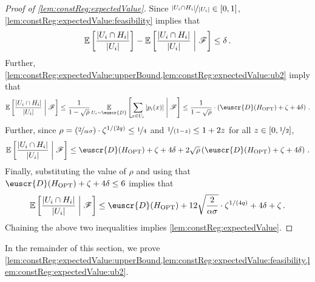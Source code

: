 \documentclass[11pt]{article}
\theoremstyle{plain}
\theoremstyle{definition}
\theoremstyle{remark}
\def\abs#1{\left| #1 \right|}
\newcommand{\given}{\;\middle|\;}
\newcommand{\inparen}[1]{\left(#1\right)}
\newcommand{\insquare}[1]{\left[#1\right]}
\newcommand{\evF}{\ensuremath{\mathscr{F}}}
\newcommand{\E}{\operatornamewithlimits{\mathbb{E}}}
\newcommand{\Ex}{\E}
\newcommand{\nfrac}[2]{\nicefrac{#1}{#2}}
\newcommand{\opt}{\ensuremath{\mathrm{OPT}}}
\newcommand{\customcal}[1]{\euscr{#1}}
\newcommand{\cD}{\customcal{D}}
\newcommand{\cDgiven}{\cD}
\begin{document}
        \begin{proof}[Proof of \cref{lem:constReg:expectedValue}]
            Since $\nfrac{\abs{U_i\cap H_i}}{\abs{U_i}}\in [0,1]$, \cref{lem:constReg:expectedValue:feasibility} implies that 
            \[
                \Ex\insquare{
                    \frac{\abs{U_i\cap H_i}}{\abs{U_i}}
                }
                - \Ex\insquare{
                    \frac{\abs{U_i\cap H_i}}{\abs{U_i}}\given \evF
                }
                \leq \delta\,.
            \]
            Further, \cref{lem:constReg:expectedValue:upperBound,lem:constReg:expectedValue:ub2} imply that 
            \[
                \Ex\insquare{
                    \frac{\abs{U_i\cap H_i}}{\abs{U_i}}\given \evF
                }\leq \frac{1}{1-\sqrt{\rho}}\Ex_{U_i\sim \cDgiven}\insquare{
                \sum_{x\in U_i} \abs{p_i(x)}
                    \given \evF
                } \leq
                    \frac{1}{1-\sqrt{\rho}}
                    \cdot \inparen{
                        \cDgiven(H_{\opt})
                        + \zeta
                        + 4\delta
                    }\,.
            \]
            Further, since $\rho=\inparen{\nfrac{2}{\alpha\sigma}} \cdot \zeta^{1/(2q)}\leq \nfrac{1}{4}$ and $\nfrac{1}{(1-z)}\leq 1+2z$ for all $z\in [0,\nfrac{1}{2}]$, 
            \[
                \Ex\insquare{
                    \frac{\abs{U_i\cap H_i}}{\abs{U_i}}\given \evF
                }
                \leq
                {
                    \cDgiven(H_{\opt})
                    + \zeta
                    + 4\delta
                }
                + 2\sqrt{\rho}\inparen{
                    \cDgiven(H_{\opt})
                    + \zeta
                    + 4\delta
                }\,.
            \]
            Finally, substituting the value of $\rho$ and using that $\cD(H_{\opt})+\zeta+4\delta\leq 6$ implies that
            \[ 
                \Ex\insquare{
                    \frac{\abs{U_i\cap H_i}}{\abs{U_i}}\given \evF
                }
                \leq
                {
                    \cDgiven(H_{\opt})
                    +
                    12 
                    \sqrt{\frac{2}{\alpha\sigma}} \cdot \zeta^{1/(4q)}
                    + 4\delta
                    + \zeta
                }
                \,. 
            \] 
            Chaining the above two inequalities implies \cref{lem:constReg:expectedValue}.
        \end{proof}
        In the remainder of this section, we prove \cref{lem:constReg:expectedValue:upperBound,lem:constReg:expectedValue:feasibility,lem:constReg:expectedValue:ub2}. %
\end{document}
